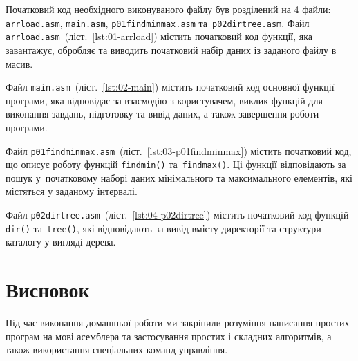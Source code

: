 \documentclass[a4paper,oneside,BCOR=1cm,DIV=12,12pt,headings=normal]{scrartcl}
\newcommand{\filename}[1]{\texttt{#1}}
\newcommand{\funcname}[1]{\texttt{#1}}
\begin{document}
		Початковий код необхідного виконуваного файлу був розділений на 4 файли: \filename{arrload.asm}, \filename{main.asm}, \filename{p01findminmax.asm} та~\filename{p02dirtree.asm}.
		Файл \filename{arrload.asm}~(ліст.~\ref{lst:01-arrload}) містить початковий код функції, яка завантажує, обробляє та виводить початковий набір даних із заданого файлу в масив.


		Файл \filename{main.asm}~(ліст.~\ref{lst:02-main}) містить початковий код основної функції програми, яка відповідає за взаємодію з користувачем, виклик функцій для виконання завдань, підготовку та вивід даних, а також завершення роботи програми.

		Файл \filename{p01findminmax.asm}~(ліст.~\ref{lst:03-p01findminmax}) містить початковий код, що описує роботу функцій \funcname{findmin()} та~\funcname{findmax()}. Ці функції відповідають за пошук у~початковому наборі даних мінімального та максимального елементів, які містяться у заданому інтервалі.

		Файл \filename{p02dirtree.asm}~(ліст.~\ref{lst:04-p02dirtree}) містить початковий код функцій \funcname{dir()} та~\funcname{tree()}, які відповідають за вивід вмісту директорії та структури каталогу у вигляді дерева.

	\section{Висновок}
		Під час виконання домашньої роботи ми закріпили розуміння написання простих програм на мові асемблера та застосування простих і складних алгоритмів, а також використання спеціальних команд управління.
\end{document}
